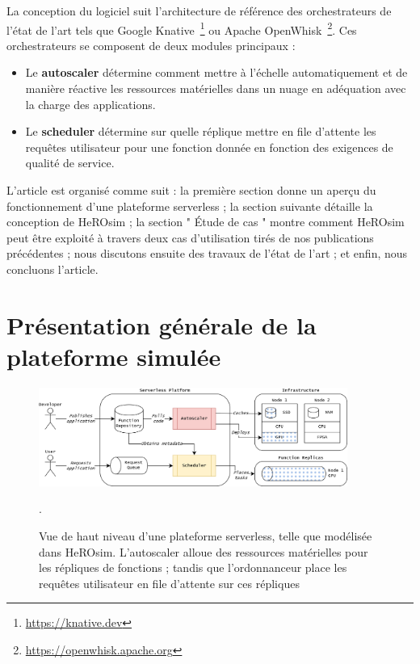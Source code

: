 La conception du logiciel suit l'architecture de référence des orchestrateurs de l'état de l'art tels que Google Knative~\footnote{\href{https://knative.dev}{https://knative.dev}} ou Apache OpenWhisk~\footnote{\href{https://openwhisk.apache.org}{https://openwhisk.apache.org}}. Ces orchestrateurs se composent de deux modules principaux :

\begin{itemize}
    \item Le \textbf{autoscaler} détermine comment mettre à l'échelle automatiquement et de manière réactive les ressources matérielles dans un nuage en adéquation avec la charge des applications.
    \item Le \textbf{scheduler} détermine sur quelle réplique mettre en file d'attente les requêtes utilisateur pour une fonction donnée en fonction des exigences de qualité de service.
\end{itemize}

L'article est organisé comme suit : la première section donne un aperçu du fonctionnement d'une plateforme serverless ; la section suivante détaille la conception de HeROsim ; la section " Étude de cas " montre comment HeROsim peut être exploité à travers deux cas d'utilisation tirés de nos publications précédentes ; nous discutons ensuite des travaux de l'état de l'art ; et enfin, nous concluons l'article.

\section{Présentation générale de la plateforme simulée}
\label{section:herosim-overview}

\begin{figure}[t]
    \centering
    \includegraphics[width=0.9\textwidth]{6_Chapitre6/figures/platform.png}
    \caption{Vue de haut niveau d'une plateforme serverless, telle que modélisée dans HeROsim. L'autoscaler alloue des ressources matérielles pour les répliques de fonctions ; tandis que l'ordonnanceur place les requêtes utilisateur en file d'attente sur ces répliques}.
\label{figure:herosim-platform}
\end{figure}

